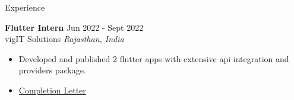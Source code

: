 \documentclass{resume}
\begin{document}
\begin{rSection}{Experience}
\vspace{-1.25em}

\item \textbf{Flutter Intern} \hfill Jun 2022 - Sept 2022\\
vigIT Solutions \hfill \textit{Rajasthan, India}
 \begin{itemize}
    \itemsep -3pt {} 
    \item Developed and published 2 flutter apps with extensive api integration and providers package.
    \item \href{https://github.com/JayNakum/JayNakum.github.io/blob/main/assets/Documents/vigIT_internship.pdf}{Completion Letter}
 \end{itemize}
\end{rSection} 
\end{document}
